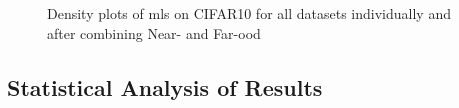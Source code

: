 \documentclass[UKenglish]{uiomasterthesis} %
\theoremstyle{definition}
\begin{document}
\begin{figure}[H]
    \begin{center}
        
    \end{center}
    \caption{Density plots of \acs*{mls} on CIFAR10 for all datasets individually and after combining Near- and Far-\acs*{ood}}
    \label{fig:full_not_full}
\end{figure}

%
%

\subsection{Statistical Analysis of Results} \label{section:ttest_methodology}
\end{document}
